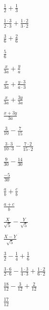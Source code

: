 \documentclass{article}
\begin{document}
\begin{enumerate}[start=28]
    \item $\frac{1}{2} + \frac{1}{3}$
    \begin{center}
        \item $\frac{1 \cdot 3}{2 \cdot 3} + \frac{1 \cdot 2}{3 \cdot 2}$
        \item $\frac{3}{6} + \frac{2}{6}$
        \item $\frac{5}{6}$
    \end{center}

    \item $\frac{x}{3a} + \frac{y}{a}$
    \begin{center}
        \item $\frac{x}{3a} + \frac{y \cdot 3}{a \cdot 3}$
        \item $\frac{x}{3a} + \frac{3y}{3a}$
        \item $\frac{x + 3y}{3a}$
    \end{center}

    \item $\frac{3}{10} - \frac{7}{15}$
    \begin{center}
        \item $\frac{3 \cdot 3}{10 \cdot 3} - \frac{7 \cdot 2}{15 \cdot 2}$
        \item $\frac{9}{30} - \frac{14}{30}$
        \item $\frac{-5}{30}$
    \end{center}

    \item $\frac{a}{b} + \frac{c}{b}$
    \begin{center}
        \item $\frac{a + c}{b}$
    \end{center}

    \item $\frac{X}{\sqrt{5}} - \frac{Y}{\sqrt{5}}$
    \begin{center}
        \item $\frac{X - Y}{\sqrt{5}}$
    \end{center}

    \item $\frac{3}{2} - \frac{1}{4} + \frac{1}{6}$
    \begin{center}
        \item $\frac{3 \cdot 6}{2 \cdot 6} - \frac{1 \cdot 3}{4 \cdot 3} + \frac{1 \cdot 2}{6 \cdot 2}$
        \item $\frac{18}{12} - \frac{3}{12} + \frac{2}{12}$
        \item $\frac{17}{12}$
    \end{center}


\end{enumerate}
\end{document}
